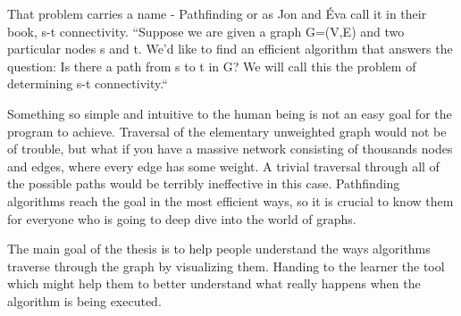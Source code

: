That problem carries a name - Pathfinding or as Jon and Éva call it in their book, s-t connectivity. ``Suppose we are given a graph G=(V,E) and two particular nodes s and t. We’d like to find an efficient algorithm that answers the question: Is there a path from s to t in G? We will call this the problem of determining s-t connectivity.``~\cite{jon-and-eva-algorithm-design}

Something so simple and intuitive to the human being is not an easy goal for the program to achieve. Traversal of the elementary unweighted graph would not be of trouble, but what if you have a massive network consisting of thousands nodes and edges, where every edge has some weight. A trivial traversal through all of the possible paths would be terribly ineffective in this case. Pathfinding algorithms reach the goal in the most efficient ways, so it is crucial to know them for everyone who is going to deep dive into the world of graphs. 

The main goal of the thesis is to help people understand the ways algorithms traverse through the graph by visualizing them. Handing to the learner the tool which might help them to better understand what really happens when the algorithm is being executed.